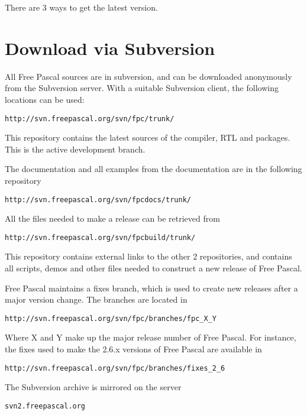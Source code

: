 There are 3 ways to get the latest version.

\section{Download via Subversion}
All Free Pascal sources are in subversion, and can be downloaded anonymously
from the Subversion server. With a suitable Subversion client, the following
locations can be used:
\begin{verbatim}
http://svn.freepascal.org/svn/fpc/trunk/
\end{verbatim}
This repository contains the latest sources of the compiler, RTL and packages. 
This is the active development branch.

The documentation and all examples from the documentation are in the
following repository
\begin{verbatim}
http://svn.freepascal.org/svn/fpcdocs/trunk/
\end{verbatim}

All the files needed to make a release can be retrieved from
\begin{verbatim}
http://svn.freepascal.org/svn/fpcbuild/trunk/
\end{verbatim}
This repository contains external links to the other 2 repositories, and
contains all scripts, demos and other files needed to construct a new
release of Free Pascal.

Free Pascal maintains a fixes branch, which is used to create new releases
after a major version change. The branches are located in 
\begin{verbatim}
http://svn.freepascal.org/svn/fpc/branches/fpc_X_Y
\end{verbatim}
Where X and Y make up the major release number of Free Pascal. 
For instance, the fixes used to make the 2.6.x versions of Free Pascal are
available in
\begin{verbatim}
http://svn.freepascal.org/svn/fpc/branches/fixes_2_6
\end{verbatim}

The Subversion archive is mirrored on the server
\begin{verbatim}
svn2.freepascal.org
\end{verbatim}


